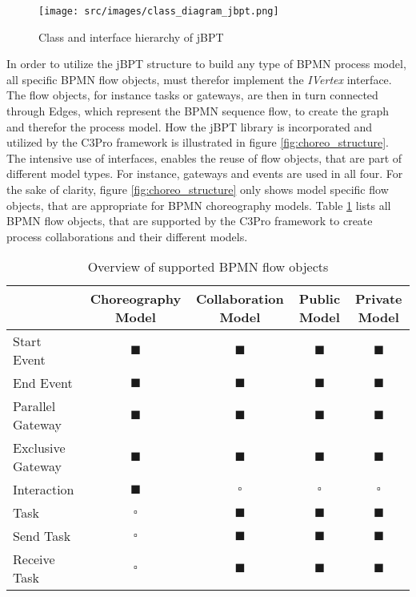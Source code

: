 \begin{figure}[H]
\texttt{[image: src/images/class\_diagram\_jbpt.png]}
\caption{Class and interface hierarchy of jBPT}
\label{fig:jbpt}
\end{figure}

In order to utilize the jBPT structure to build any type of BPMN process model, all specific BPMN flow objects, must therefor implement the \textit{IVertex} interface. The flow objects, for instance tasks or gateways, are then in turn connected through Edges, which represent the BPMN sequence flow, to create the graph and therefor the process model. How the jBPT library is incorporated and utilized by the C3Pro framework is illustrated in figure \ref{fig:choreo_structure}. 
The intensive use of interfaces, enables the reuse of flow objects, that are part of different model types. For instance, gateways and events are used in all four. For the sake of clarity, figure \ref{fig:choreo_structure} only shows model specific flow objects, that are appropriate for BPMN choreography models. Table \ref{tab:flow_objects} lists all BPMN flow objects, that are supported by the C3Pro framework to create process collaborations and their different models.\\

\begin{table}[H]
\resizebox{\textwidth}{!}
{
\begin{tabular}{l|cccc}
			      & Choreography Model & Collaboration Model & Public Model & Private Model \\ \hline
Start Event       & $\blacksquare$	  & $\blacksquare$      & $\blacksquare$	  & $\blacksquare$  \\
End Event         & $\blacksquare$	  & $\blacksquare$      & $\blacksquare$	  & $\blacksquare$  \\
Parallel Gateway  & $\blacksquare$    & $\blacksquare$      & $\blacksquare$      & $\blacksquare$  \\
Exclusive Gateway & $\blacksquare$    & $\blacksquare$      & $\blacksquare$      & $\blacksquare$  \\
Interaction       & $\blacksquare$    & $\square$           & $\square$           & $\square$       \\
Task          	  & $\square$         & $\blacksquare$      & $\blacksquare$      & $\blacksquare$  \\
Send Task         & $\square$         & $\blacksquare$      & $\blacksquare$      & $\blacksquare$  \\
Receive Task      & $\square$         & $\blacksquare$		& $\blacksquare$      & $\blacksquare$       
\end{tabular}%
}
\caption{Overview of supported BPMN flow objects}
\label{tab:flow_objects}
\end{table}

